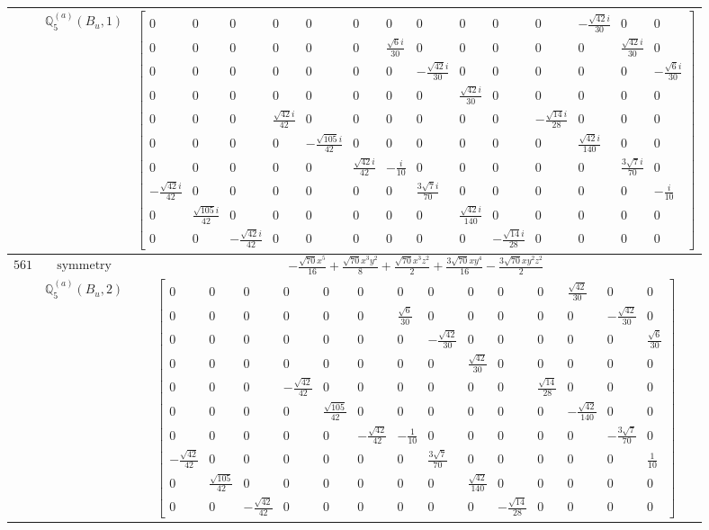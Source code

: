 \documentclass[fleqn,8pt,landscape]{jsarticle}
\begin{document}
\begin{longtable}{ccc}
$  $ & $ \mathbb{Q}_{5}^{(a)}(B_{u},1) $ & $ \begin{bmatrix} 0 & 0 & 0 & 0 & 0 & 0 & 0 & 0 & 0 & 0 & 0 & - \frac{\sqrt{42} i}{30} & 0 & 0 \\ 0 & 0 & 0 & 0 & 0 & 0 & \frac{\sqrt{6} i}{30} & 0 & 0 & 0 & 0 & 0 & \frac{\sqrt{42} i}{30} & 0 \\ 0 & 0 & 0 & 0 & 0 & 0 & 0 & - \frac{\sqrt{42} i}{30} & 0 & 0 & 0 & 0 & 0 & - \frac{\sqrt{6} i}{30} \\ 0 & 0 & 0 & 0 & 0 & 0 & 0 & 0 & \frac{\sqrt{42} i}{30} & 0 & 0 & 0 & 0 & 0 \\ 0 & 0 & 0 & \frac{\sqrt{42} i}{42} & 0 & 0 & 0 & 0 & 0 & 0 & - \frac{\sqrt{14} i}{28} & 0 & 0 & 0 \\ 0 & 0 & 0 & 0 & - \frac{\sqrt{105} i}{42} & 0 & 0 & 0 & 0 & 0 & 0 & \frac{\sqrt{42} i}{140} & 0 & 0 \\ 0 & 0 & 0 & 0 & 0 & \frac{\sqrt{42} i}{42} & - \frac{i}{10} & 0 & 0 & 0 & 0 & 0 & \frac{3 \sqrt{7} i}{70} & 0 \\ - \frac{\sqrt{42} i}{42} & 0 & 0 & 0 & 0 & 0 & 0 & \frac{3 \sqrt{7} i}{70} & 0 & 0 & 0 & 0 & 0 & - \frac{i}{10} \\ 0 & \frac{\sqrt{105} i}{42} & 0 & 0 & 0 & 0 & 0 & 0 & \frac{\sqrt{42} i}{140} & 0 & 0 & 0 & 0 & 0 \\ 0 & 0 & - \frac{\sqrt{42} i}{42} & 0 & 0 & 0 & 0 & 0 & 0 & - \frac{\sqrt{14} i}{28} & 0 & 0 & 0 & 0 \end{bmatrix} $ \\ \hline
$ 561 $ & $ \text{symmetry} $ & $ - \frac{\sqrt{70} x^{5}}{16} + \frac{\sqrt{70} x^{3} y^{2}}{8} + \frac{\sqrt{70} x^{3} z^{2}}{2} + \frac{3 \sqrt{70} x y^{4}}{16} - \frac{3 \sqrt{70} x y^{2} z^{2}}{2} $ \\
$  $ & $ \mathbb{Q}_{5}^{(a)}(B_{u},2) $ & $ \begin{bmatrix} 0 & 0 & 0 & 0 & 0 & 0 & 0 & 0 & 0 & 0 & 0 & \frac{\sqrt{42}}{30} & 0 & 0 \\ 0 & 0 & 0 & 0 & 0 & 0 & \frac{\sqrt{6}}{30} & 0 & 0 & 0 & 0 & 0 & - \frac{\sqrt{42}}{30} & 0 \\ 0 & 0 & 0 & 0 & 0 & 0 & 0 & - \frac{\sqrt{42}}{30} & 0 & 0 & 0 & 0 & 0 & \frac{\sqrt{6}}{30} \\ 0 & 0 & 0 & 0 & 0 & 0 & 0 & 0 & \frac{\sqrt{42}}{30} & 0 & 0 & 0 & 0 & 0 \\ 0 & 0 & 0 & - \frac{\sqrt{42}}{42} & 0 & 0 & 0 & 0 & 0 & 0 & \frac{\sqrt{14}}{28} & 0 & 0 & 0 \\ 0 & 0 & 0 & 0 & \frac{\sqrt{105}}{42} & 0 & 0 & 0 & 0 & 0 & 0 & - \frac{\sqrt{42}}{140} & 0 & 0 \\ 0 & 0 & 0 & 0 & 0 & - \frac{\sqrt{42}}{42} & - \frac{1}{10} & 0 & 0 & 0 & 0 & 0 & - \frac{3 \sqrt{7}}{70} & 0 \\ - \frac{\sqrt{42}}{42} & 0 & 0 & 0 & 0 & 0 & 0 & \frac{3 \sqrt{7}}{70} & 0 & 0 & 0 & 0 & 0 & \frac{1}{10} \\ 0 & \frac{\sqrt{105}}{42} & 0 & 0 & 0 & 0 & 0 & 0 & \frac{\sqrt{42}}{140} & 0 & 0 & 0 & 0 & 0 \\ 0 & 0 & - \frac{\sqrt{42}}{42} & 0 & 0 & 0 & 0 & 0 & 0 & - \frac{\sqrt{14}}{28} & 0 & 0 & 0 & 0 \end{bmatrix} $ \\ \hline

\end{longtable}
\end{document}

